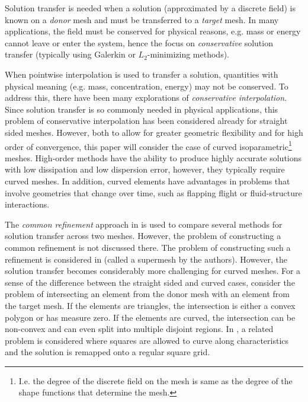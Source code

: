 \documentclass[oneside, reqno]{amsart}
\theoremstyle{definition}
\begin{document}
Solution transfer is needed when a solution
(approximated by a discrete field) is known on a \emph{donor} mesh and must
be transferred to a \emph{target} mesh. In many applications, the field
must be conserved for physical reasons, e.g. mass or energy cannot leave or
enter the system, hence the focus on \emph{conservative} solution transfer
(typically using Galerkin or \(L_2\)-minimizing methods).

When pointwise interpolation is used to transfer a solution, quantities with
physical meaning (e.g. mass, concentration, energy) may not be conserved.
To address this, there have been many explorations of
\emph{conservative interpolation}. Since solution transfer is so commonly
needed in physical applications, this problem of conservative interpolation
has been considered already for straight sided meshes.
However, both to allow for greater
geometric flexibility and for high order of convergence, this paper will
consider the case of curved isoparametric\footnote{I.e. the degree of the
discrete field on the mesh is same as the degree of the shape functions that
determine the mesh.} meshes. High-order methods
have the ability to produce highly accurate solutions
with low dissipation and low dispersion error, however, they typically
require curved meshes. In addition, curved elements have
advantages in problems that involve geometries that change over time,
such as flapping flight or fluid-structure interactions.

The \emph{common refinement} approach in
\cite{Jiao2004} is used to compare several methods for solution transfer across
two meshes. However, the problem of constructing a common refinement is
not discussed there. The problem of constructing such a refinement is
considered in \cite{Farrell2009, Farrell2011} (called a supermesh by
the authors).
However, the solution transfer becomes considerably more challenging for curved
meshes. For a sense of the difference between the straight sided and curved
cases, consider the problem of intersecting an element from the donor mesh
with an element from the target mesh. If the elements are triangles, the
intersection is either a convex polygon or has measure zero. If the elements
are curved, the intersection can be non-convex and can even split into
multiple disjoint regions. In \cite{Qiu2018}, a related problem is considered
where squares are allowed to curve along characteristics and the solution is
remapped onto a regular square grid.
\end{document}
